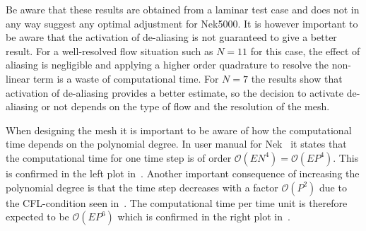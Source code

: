 %
Be aware that these results are obtained from a laminar test case and does not in any way 
suggest any optimal adjustment for Nek5000. It is however important to be aware that the activation 
of de-aliasing is not guaranteed to give a better result. For a well-resolved flow situation such as $N=11$ 
for this case, the effect of aliasing is negligible and applying a higher order quadrature to resolve the 
non-linear term is a waste of computational time. For $N=7$ the results show that activation of de-aliasing
provides a better estimate, so the decision to activate de-aliasing or not depends on the type of flow
and the resolution of the mesh.

When designing the mesh it is important to be aware of how the computational time depends on the polynomial 
degree. In user manual for Nek~\cite{Nek} it states that the computational time for one time step is 
of order $\mathcal{O}(EN^4) = \mathcal{O}(EP^4)$. This is confirmed in the left plot in~.
Another important consequence of increasing the polynomial degree is that the time step decreases with a factor
$\mathcal{O}(P^2)$ due to the CFL-condition seen in~. The computational time per 
time unit is therefore expected to be $\mathcal{O}(EP^{6})$ which is confirmed in the right plot in~.

